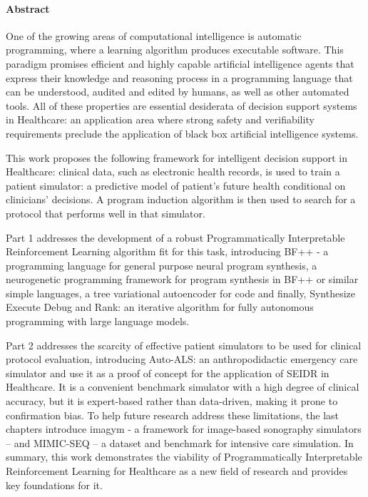 \paragraph{Abstract}

One of the growing areas of computational intelligence is automatic programming, where a learning algorithm produces executable software. This paradigm promises efficient and highly capable artificial intelligence agents that express their knowledge and reasoning process in a programming language that can be understood, audited and edited by humans, as well as other automated tools. All of these properties are essential desiderata of decision support systems in Healthcare: an application area where strong safety and verifiability requirements preclude the application of black box artificial intelligence systems.

This work proposes the following framework for intelligent decision support in Healthcare: clinical data, such as electronic health records, is used to train a patient simulator: a predictive model of patient’s future health conditional on clinicians’ decisions. A program induction algorithm is then used to search for a protocol that performs well in that simulator.

Part 1 addresses the development of a robust Programmatically Interpretable Reinforcement Learning algorithm fit for this task, introducing BF++ - a programming language for general purpose neural program synthesis, a neurogenetic programming framework for program synthesis in BF++ or similar simple languages, a tree variational autoencoder for code and finally, Synthesize Execute Debug and Rank: an iterative algorithm for fully autonomous programming with large language models.

Part 2 addresses the scarcity of effective patient simulators to be used for clinical protocol evaluation, introducing Auto-ALS: an anthropodidactic emergency care simulator and use it as a proof of concept for the application of SEIDR in Healthcare.
It is a convenient benchmark simulator with a high degree of clinical accuracy, but it is expert-based rather than data-driven, making it prone to confirmation bias. 
To help future research address these limitations, the last chapters introduce imagym - a framework for image-based sonography simulators – and MIMIC-SEQ – a dataset and benchmark for intensive care simulation. 
In summary, this work demonstrates the viability of Programmatically Interpretable Reinforcement Learning for Healthcare as a new field of research and provides key foundations for it.